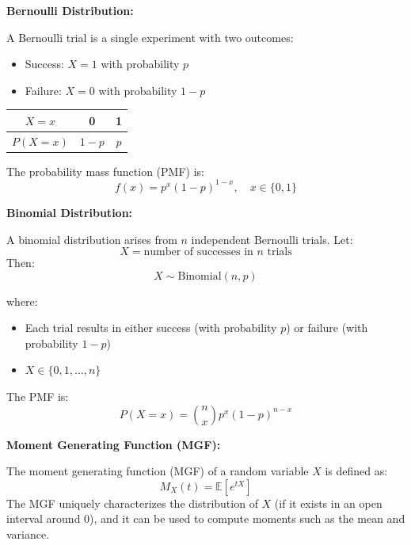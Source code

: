 \begin{tcolorbox}[title=Review from STA256,
  colback=gray!5, 
  colframe=gray!40!black, 
  coltitle=black, 
  colbacktitle=gray!20,  %
  fonttitle=\bfseries,
  sharp corners=south,
  breakable]


\textbf{Bernoulli Distribution:}

A Bernoulli trial is a single experiment with two outcomes:
\begin{itemize}
  \item Success: \( X = 1 \) with probability \( p \)
  \item Failure: \( X = 0 \) with probability \( 1 - p \)
\end{itemize}

\medskip

\begin{center}
\renewcommand{\arraystretch}{1.3}
\begin{tabular}{|c|c|c|}
\hline
\( X = x \) & 0 & 1 \\
\hline
\( P(X = x) \) & \( 1 - p \) & \( p \) \\
\hline
\end{tabular}
\end{center}

The probability mass function (PMF) is:
\[
f(x) = p^x (1 - p)^{1 - x}, \quad x \in \{0, 1\}
\]

\medskip

\textbf{Binomial Distribution:}

A binomial distribution arises from \( n \) independent Bernoulli trials. Let:
\[
X = \text{number of successes in } n \text{ trials}
\]
Then:
\[
X \sim \text{Binomial}(n, p)
\]

where:
\begin{itemize}
  \item Each trial results in either success (with probability \( p \)) or failure (with probability \( 1 - p \))
  \item \( X \in \{0, 1, \dots, n\} \)
\end{itemize}

The PMF is:
\[
P(X = x) = \binom{n}{x} p^x (1 - p)^{n - x}
\]

\medskip

\textbf{Moment Generating Function (MGF):}

The moment generating function (MGF) of a random variable \( X \) is defined as:
\[
M_X(t) = \mathbb{E}[e^{tX}]
\]
The MGF uniquely characterizes the distribution of \( X \) (if it exists in an open interval around 0), and it can be used to compute moments such as the mean and variance.


\end{tcolorbox}

